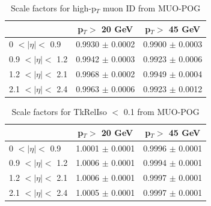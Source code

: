 \begin{table}[hp]
\begin{center}
\begin{tabular}{|l|c|c|}
\hline
 & p$_{T} >$ 20 GeV & p$_{T} >$ 45 GeV \\
\hline
0 $< |\eta| <$ 0.9 & 0.9930 $\pm$ 0.0002 & 0.9900 $\pm$ 0.0003 \\
0.9 $< |\eta| <$ 1.2 & 0.9942 $\pm$ 0.0003 & 0.9923 $\pm$ 0.0006 \\
1.2 $< |\eta| <$ 2.1 & 0.9968 $\pm$ 0.0002 & 0.9949 $\pm$ 0.0004 \\
2.1 $< |\eta| <$ 2.4 & 0.9963 $\pm$ 0.0006 & 0.9923 $\pm$ 0.0012 \\
\hline
\end{tabular}
\caption{\label{tab:SF_hptMu}Scale factors for high-p$_{T}$ muon ID from MUO-POG}
\end{center}
\end{table}

\begin{table}[hp]
\begin{center}
\begin{tabular}{|l|c|c|}
\hline
 & p$_{T} >$ 20 GeV & p$_{T} >$ 45 GeV \\
\hline
0 $< |\eta| <$ 0.9 & 1.0001 $\pm$ 0.0001 & 0.9996 $\pm$ 0.0001 \\
0.9 $< |\eta| <$ 1.2 & 1.0006 $\pm$ 0.0001 & 0.9994 $\pm$ 0.0001 \\
1.2 $< |\eta| <$ 2.1 & 1.0006 $\pm$ 0.0001 & 0.9997 $\pm$ 0.0001 \\
2.1 $< |\eta| <$ 2.4 & 1.0005 $\pm$ 0.0001 & 0.9997 $\pm$ 0.0001 \\
\hline
\end{tabular}
\caption{\label{tab:SF_IsoTrkMu}Scale factors for TkRelIso $<$ 0.1 from MUO-POG}
\end{center}
\end{table}


